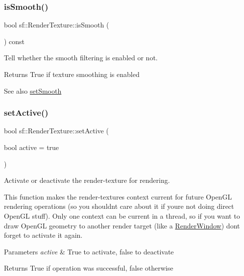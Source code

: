 \subsubsection{\texorpdfstring{is\+Smooth()}{isSmooth()}}
{\footnotesize\ttfamily bool sf\+::\+Render\+Texture\+::is\+Smooth (\begin{DoxyParamCaption}{ }\end{DoxyParamCaption}) const}



Tell whether the smooth filtering is enabled or not. 

\begin{DoxyReturn}{Returns}
True if texture smoothing is enabled
\end{DoxyReturn}
\begin{DoxySeeAlso}{See also}
\hyperlink{classsf_1_1_render_texture_af08991e63c6020865dd07b20e27305b6}{set\+Smooth} 
\end{DoxySeeAlso}
\mbox{\label{classsf_1_1_render_texture_a5da95ecdbce615a80bb78399012508cf}} 
\subsubsection{\texorpdfstring{set\+Active()}{setActive()}}
{\footnotesize\ttfamily bool sf\+::\+Render\+Texture\+::set\+Active (\begin{DoxyParamCaption}\item[{bool}]{active = {\ttfamily true} }\end{DoxyParamCaption})}



Activate or deactivate the render-\/texture for rendering. 

This function makes the render-\/texture\textquotesingle{}s context current for future Open\+GL rendering operations (so you shouldn\textquotesingle{}t care about it if you\textquotesingle{}re not doing direct Open\+GL stuff). Only one context can be current in a thread, so if you want to draw Open\+GL geometry to another render target (like a \hyperlink{classsf_1_1_render_window}{Render\+Window}) don\textquotesingle{}t forget to activate it again.


\begin{DoxyParams}{Parameters}
{\em active} & True to activate, false to deactivate\\
\hline
\end{DoxyParams}
\begin{DoxyReturn}{Returns}
True if operation was successful, false otherwise 
\end{DoxyReturn}
\mbox{\label{classsf_1_1_render_texture_af8f97b33512bf7d5b6be3da6f65f7365}} 

